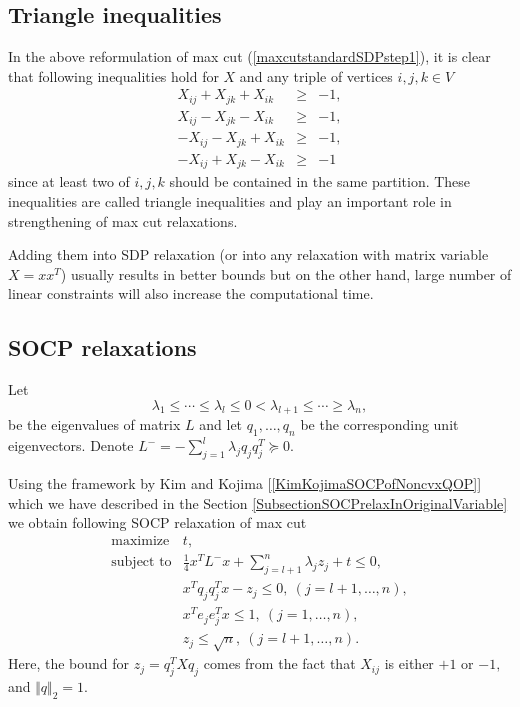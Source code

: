 \documentclass[12pt]{book}
\theoremstyle{definition}
\begin{document}
\subsection{Triangle inequalities}

In the above reformulation of max cut (\ref{maxcutstandardSDPstep1}),
it is clear that following inequalities hold for $X$ and any triple of vertices $i,j,k\in V$
\begin{equation}
\label{MaxCutTriangleInequalities}
\begin{array}{rcl}
X_{ij} + X_{jk} + X_{ik} &\geq & -1, \\
X_{ij} - X_{jk} - X_{ik} &\geq & -1, \\
- X_{ij} - X_{jk} + X_{ik} &\geq & -1, \\
- X_{ij} + X_{jk} - X_{ik} &\geq & -1
\end{array}
\end{equation}
since at least two of $i,j,k$ should be contained in the same partition.
These inequalities are called triangle inequalities and play an important role in strengthening of max cut relaxations. 

Adding them into SDP relaxation (or into any relaxation with matrix variable $X=xx^T$) usually results in better bounds but on the other hand, large number of linear constraints will also increase the computational time.	


\subsection{SOCP relaxations}



Let $$\lambda_1\leq \cdots \leq \lambda_l \leq  0 < \lambda_{l+1} \leq \cdots \geq \lambda_n, $$
be the eigenvalues of matrix $L$ and let $q_1,\dots , q_n$ be the corresponding unit eigenvectors. Denote $L^- = -\sum_{j = 1}^{l}\lambda_j q_jq_j^T\succeq 0$.


Using the framework by Kim and Kojima [\ref{KimKojimaSOCPofNoncvxQOP}] which we have described in the Section \ref{SubsectionSOCPrelaxInOriginalVariable} we obtain following SOCP relaxation of max cut
\begin{equation}
\begin{array}{ll}
\label{MaxCutSOCPRelax1}
\mbox{maximize} & t, \\
\mbox{subject to} & \frac{1}{4}x^TL^-x + \sum_{j=l+1}^n\lambda_jz_j + t \leq 0 , \\
&	x^Tq_jq_j^Tx - z_j \leq 0, \ (j = l+1,\dots ,n), \\
&  	x^Te_je_j^Tx \leq 1, \ (j = 1,\dots ,n), \\
& z_j \leq \sqrt{n}, \ (j = l+1,\dots ,n).
\end{array}
\end{equation}
Here, the bound for $z_j = q^T_jXq_j$ comes from the fact that $X_{ij}$ is either $+1$ or $-1,$ and $\Vert q \Vert_2 = 1.$
\end{document}
